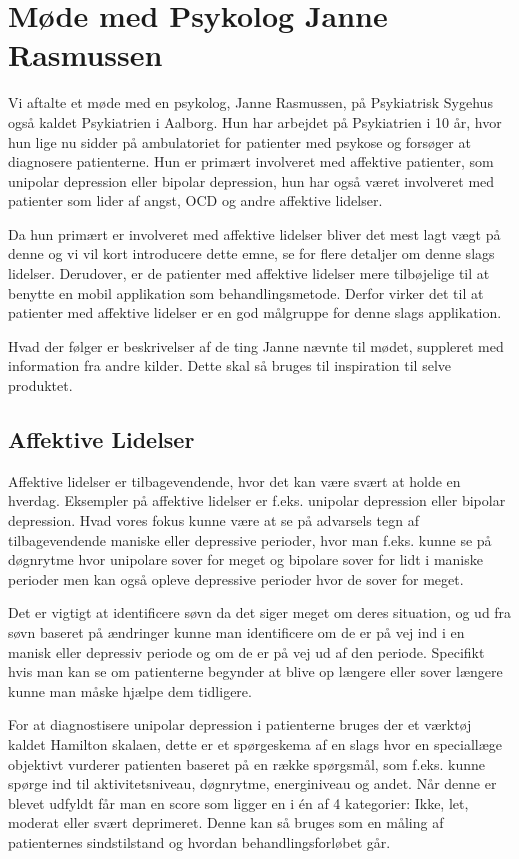 \section{Møde med Psykolog Janne Rasmussen}\label{sec:moede-med-psykolog}
Vi aftalte et møde med en psykolog, Janne Rasmussen, på Psykiatrisk Sygehus også kaldet Psykiatrien i Aalborg.
Hun har arbejdet på Psykiatrien i 10 år, hvor hun lige nu sidder på ambulatoriet for patienter med psykose og forsøger at diagnosere patienterne. 
Hun er primært involveret med affektive patienter, som unipolar depression eller bipolar depression, hun har også været involveret med patienter som lider af angst, OCD og andre affektive lidelser.

Da hun primært er involveret med affektive lidelser bliver det mest lagt vægt på denne og vi vil kort introducere dette emne, se  for flere detaljer om denne slags lidelser.
Derudover, er de patienter med affektive lidelser mere tilbøjelige til at benytte en mobil applikation som behandlingsmetode.
Derfor virker det til at patienter med affektive lidelser er en god målgruppe for denne slags applikation.

Hvad der følger er beskrivelser af de ting Janne nævnte til mødet, suppleret med information fra andre kilder. 
Dette skal så bruges til inspiration til selve produktet.

\subsection{Affektive Lidelser}
Affektive lidelser er tilbagevendende, hvor det kan være svært at holde en hverdag.
Eksempler på affektive lidelser er f.eks. unipolar depression eller bipolar depression.
Hvad vores fokus kunne være at se på advarsels tegn af tilbagevendende maniske eller depressive perioder, hvor man f.eks. kunne se på døgnrytme hvor unipolare sover for meget og bipolare sover for lidt i maniske perioder men kan også opleve depressive perioder hvor de sover for meget.

Det er vigtigt at identificere søvn da det siger meget om deres situation, og ud fra søvn baseret på ændringer kunne man identificere om de er på vej ind i en manisk eller depressiv periode og om de er på vej ud af den periode. 
Specifikt hvis man kan se om patienterne begynder at blive op længere eller sover længere kunne man måske hjælpe dem tidligere.

For at diagnostisere unipolar depression i patienterne bruges der et værktøj kaldet Hamilton skalaen, dette er et spørgeskema af en slags hvor en speciallæge objektivt vurderer patienten baseret på en række spørgsmål, som f.eks. kunne spørge ind til aktivitetsniveau, døgnrytme, energiniveau og andet.
Når denne er blevet udfyldt får man en score som ligger en i én af 4 kategorier: Ikke, let, moderat eller svært deprimeret. 
Denne kan så bruges som en måling af patienternes sindstilstand og hvordan behandlingsforløbet går.

